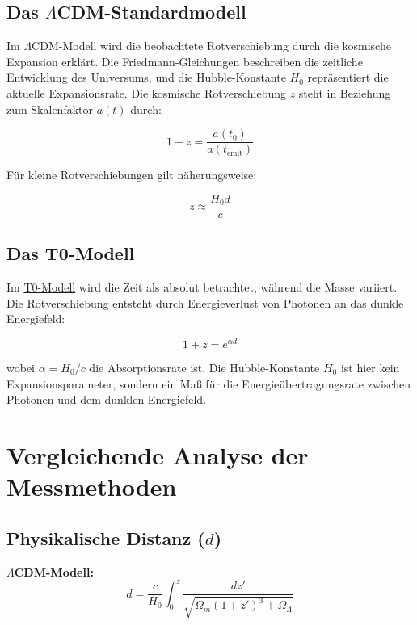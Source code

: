 \documentclass[a4paper,12pt]{article}
\theoremstyle{definition}
\theoremstyle{remark}
\newcommand{\repobase}{https://github.com/jpascher/T0-Time-Mass-Duality/tree/main/2/}
\begin{document}
	\subsection{Das $\Lambda$CDM-Standardmodell}
	
	Im $\Lambda$CDM-Modell wird die beobachtete Rotverschiebung durch die kosmische Expansion erklärt. Die Friedmann-Gleichungen beschreiben die zeitliche Entwicklung des Universums, und die Hubble-Konstante $H_0$ repräsentiert die aktuelle Expansionsrate. Die kosmische Rotverschiebung $z$ steht in Beziehung zum Skalenfaktor $a(t)$ durch:
	
	\begin{equation}
		1 + z = \frac{a(t_0)}{a(t_{\text{emit}})}
	\end{equation}
	
	Für kleine Rotverschiebungen gilt näherungsweise:
	
	\begin{equation}
		z \approx \frac{H_0 d}{c}
	\end{equation}
	
	\subsection{Das T0-Modell}
	Im {\small\href{\repobase/pdf/Deutsch/Wesentliche mathematische Formalismen der Zeit-Masse-Dualitätstheorie mit Lagrange-Dichten.pdf}{T0-Modell}} wird die Zeit als absolut betrachtet, während die Masse variiert. Die Rotverschiebung entsteht durch Energieverlust von Photonen an das dunkle Energiefeld:
	
	\begin{equation}
		1 + z = e^{\alpha d}
	\end{equation}
	
	wobei $\alpha = H_0/c$ die Absorptionsrate ist. Die Hubble-Konstante $H_0$ ist hier kein Expansionsparameter, sondern ein Maß für die Energieübertragungsrate zwischen Photonen und dem dunklen Energiefeld.
	
	\section{Vergleichende Analyse der Messmethoden}
	
	\subsection{Physikalische Distanz ($d$)}
	
	\textbf{$\Lambda$CDM-Modell:}
	\begin{equation}
		d = \frac{c}{H_0} \int_0^z \frac{dz'}{\sqrt{\Omega_m (1 + z')^3 + \Omega_\Lambda}}
	\end{equation}
	
\end{document}
